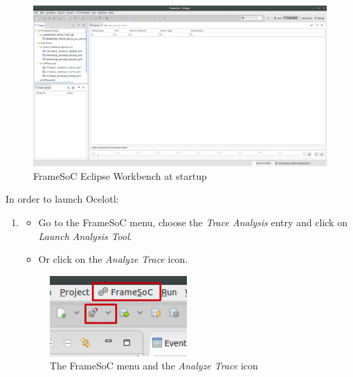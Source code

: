 \documentclass[twoside]{article}
\begin{document}
\begin{sloppypar}
\begin{figure}[h!]
	\centering
    \includegraphics[width=1.0\textwidth]{images/framesoc_launch.png}
	\caption{FrameSoC Eclipse Workbench at startup}
	\label{frameLaunch}
\end{figure}

In order to launch Ocelotl:

\begin{enumerate}
	\item 
	\begin{itemize}
		\item Go to the FrameSoC menu, choose the \textit{Trace Analysis} entry and click on \textit{Launch Analysis Tool}. 
		\item Or click on the \textit{Analyze Trace} icon.
	\end{itemize}

	\begin{figure}[h!]
		\centering
		\includegraphics[scale=0.5]{images/labeled.png}
		\caption{The FrameSoC menu and the \textit{Analyze Trace} icon}
		\label{launchOcelotl}
	\end{figure}
	

\end{enumerate}
\end{sloppypar}
\end{document}

